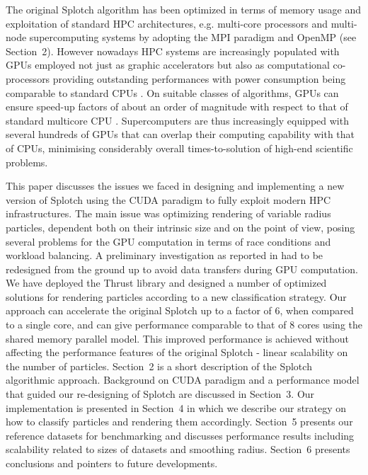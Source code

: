 \documentclass[1p]{elsarticle}
\begin{document}

The original Splotch algorithm has been optimized in terms of memory usage and exploitation of standard HPC architectures, e.g. multi-core processors and multi-node supercomputing systems by adopting the MPI paradigm \cite{jin:high-performance} and OpenMP (see Section~2). However nowadays HPC systems are increasingly populated with GPUs employed not just as graphic accelerators but also as computational co-processors providing outstanding performances with power consumption being comparable to standard CPUs \cite{}. On suitable classes of algorithms, GPUs can ensure speed-up factors of about an order of magnitude with respect to that of standard multicore CPU \cite{}. Supercomputers are thus increasingly equipped with several hundreds of GPUs that can overlap their computing capability with that of CPUs, minimising considerably overall times-to-solution of high-end scientific problems.

This paper discusses the issues we faced in designing and implementing a new version of Splotch using the CUDA paradigm to fully exploit modern HPC infrastructures. The main issue was optimizing rendering of variable radius particles, dependent both on their intrinsic size and on the point of view, posing several problems for the GPU computation in terms of race conditions and workload balancing. A preliminary investigation as reported in \cite{jin:high-performance} had to be redesigned from the ground up to avoid data transfers during GPU computation. We have deployed the Thrust library \cite{thrusturl} and designed a number of optimized solutions for rendering particles according to a new classification strategy. Our approach can accelerate the original Splotch up to a factor of 6, when compared to a single core, and 
can give performance comparable to that of 8 cores using the shared memory parallel model. 
This improved performance is achieved without affecting the performance features of the original Splotch - linear scalability on the number of particles. 
Section~2 is a short description of the Splotch algorithmic approach. Background on CUDA paradigm and a performance model that guided our re-designing of Splotch are discussed in Section~3. Our implementation is presented in Section~4 in which we describe our strategy on how to classify particles and rendering them accordingly. Section~5 presents our reference datasets for benchmarking and discusses performance results including scalability related to sizes of datasets and smoothing radius. Section~6 presents conclusions and pointers to future developments.
\end{document}
